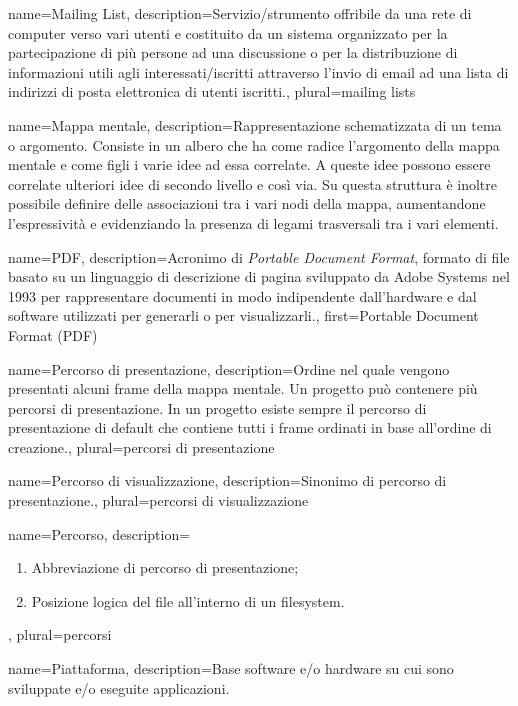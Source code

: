 {
name={Mailing List},
description={Servizio/strumento offribile da una rete di computer verso vari utenti e costituito da un sistema organizzato per la partecipazione di più persone ad una discussione o per la distribuzione di informazioni utili agli interessati/iscritti attraverso l'invio di email ad una lista di indirizzi di posta elettronica di utenti iscritti.},
plural={mailing lists}
}

{
name={Mappa mentale},
description={Rappresentazione schematizzata di un tema o argomento. Consiste in un albero che ha come radice l’argomento della mappa mentale e come figli i varie idee ad essa correlate. A queste idee possono essere correlate ulteriori idee di secondo livello e così via. Su questa struttura è inoltre possibile definire delle associazioni tra i vari nodi della mappa, aumentandone l’espressività e evidenziando la presenza di legami trasversali tra i vari elementi.}
}

{
name={PDF},
description={Acronimo di \textit{Portable Document Format}, formato di file basato su un linguaggio di descrizione di pagina sviluppato da Adobe Systems nel 1993 per rappresentare documenti in modo indipendente dall'hardware e dal software utilizzati per generarli o per visualizzarli.},
first={Portable Document Format (PDF)}
}

{
name={Percorso di presentazione},
description={Ordine nel quale vengono presentati alcuni frame della mappa mentale. Un progetto può contenere più percorsi di presentazione. In un progetto esiste sempre il percorso di presentazione di default che contiene tutti i frame ordinati in base all’ordine di creazione.},
plural={percorsi di presentazione}
}

{
name={Percorso di visualizzazione},
description={Sinonimo di percorso di presentazione.},
plural={percorsi di visualizzazione}
}

{
name={Percorso},
description={\begin{enumerate}
\item Abbreviazione di percorso di presentazione;
\item Posizione logica del file all’interno di un filesystem.
\end{enumerate}},
plural={percorsi}
}

{
name={Piattaforma},
description={Base software e/o hardware su cui sono sviluppate e/o eseguite applicazioni.}
}

